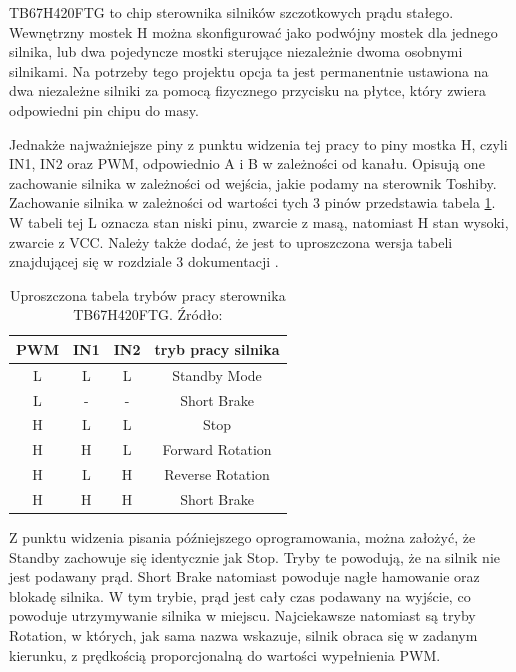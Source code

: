 TB67H420FTG to chip sterownika silników szczotkowych prądu stałego. Wewnętrzny mostek H można skonfigurować jako podwójny mostek dla jednego silnika, lub dwa pojedyncze mostki sterujące niezależnie dwoma osobnymi silnikami. Na potrzeby tego projektu opcja ta jest permanentnie ustawiona na dwa niezależne silniki za pomocą fizycznego przycisku na płytce, który zwiera odpowiedni pin chipu do masy. \cite{Toshiba_docs}

Jednakże najważniejsze piny z punktu widzenia tej pracy to piny mostka H, czyli IN1, IN2 oraz PWM, odpowiednio A i B w zależności od kanału. Opisują one zachowanie silnika w zależności od wejścia, jakie podamy na sterownik Toshiby. Zachowanie silnika w zależności od wartości tych 3 pinów przedstawia tabela \ref{table:Toshiba_pins}. W tabeli tej L oznacza stan niski pinu, zwarcie z masą, natomiast H stan wysoki, zwarcie z VCC. Należy także dodać, że jest to uproszczona wersja tabeli znajdującej się w rozdziale 3 dokumentacji \cite{Toshiba_docs}.

\begin{table}[h!]
\centering
\begin{tabular}{c | c c | c }
 PWM & IN1 & IN2 & tryb pracy silnika \\
 \hline
L & L & L & Standby Mode \\
L & - & - & Short Brake \\
H & L & L & Stop \\
H & H & L & Forward Rotation \\
H & L & H & Reverse Rotation \\
H & H & H & Short Brake \\
\end{tabular}
\caption{Uproszczona tabela trybów pracy sterownika TB67H420FTG. Źródło: \cite{Toshiba_docs}}
\label{table:Toshiba_pins}
\end{table}

Z punktu widzenia pisania późniejszego oprogramowania, można założyć, że Standby zachowuje się identycznie jak Stop. Tryby te powodują, że na silnik nie jest podawany prąd. Short Brake natomiast powoduje nagłe hamowanie oraz blokadę silnika. W tym trybie, prąd jest cały czas podawany na wyjście, co powoduje utrzymywanie silnika w miejscu. Najciekawsze natomiast są tryby Rotation, w których, jak sama nazwa wskazuje, silnik obraca się w zadanym kierunku, z prędkością proporcjonalną do wartości wypełnienia PWM.